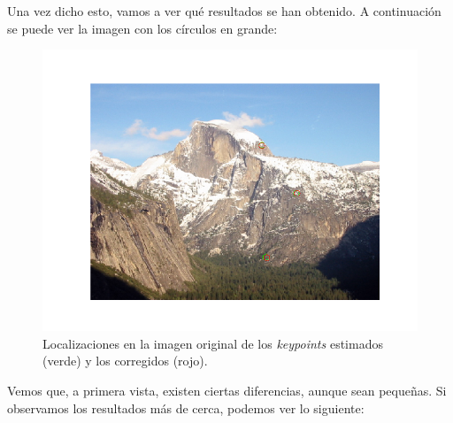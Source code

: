 \documentclass[11pt,a4paper]{article}
\begin{document}
Una vez dicho esto, vamos a ver qué resultados se han obtenido. A continuación se puede ver la imagen
con los círculos en grande:

\begin{figure}[H]
	\centering
	\includegraphics[scale=0.6]{img/kp-diff-big}
	\caption{Localizaciones en la imagen original de los \textit{keypoints} estimados (verde) y los corregidos
	(rojo).}
	\label{fig:kp-diff-big}
\end{figure}

Vemos que, a primera vista, existen ciertas diferencias, aunque sean pequeñas. Si observamos los resultados
más de cerca, podemos ver lo siguiente:
\end{document}
